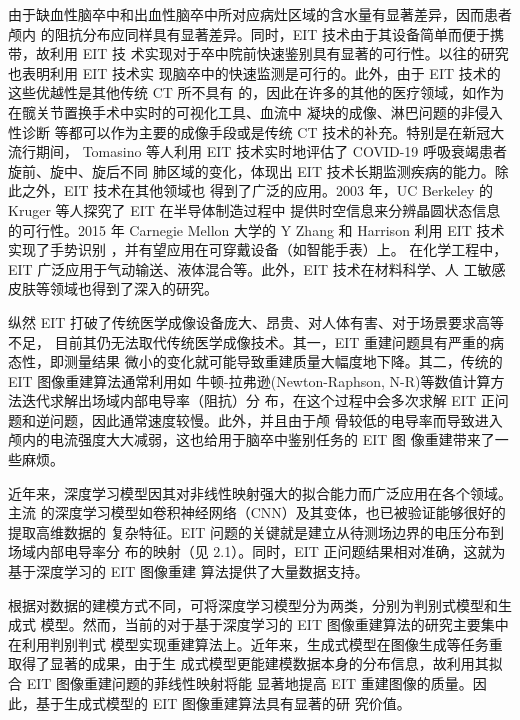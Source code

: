   由于缺血性脑卒中和出血性脑卒中所对应病灶区域的含水量有显著差异，因而患者颅内
  的阻抗分布应同样具有显著差异。同时，EIT 技术由于其设备简单而便于携带，故利用 EIT 技
  术实现对于卒中院前快速鉴别具有显著的可行性。以往的研究\cite{8936983}\cite{2023Applied}\cite{Acosd}也表明利用 EIT 技术实
  现脑卒中的快速监测是可行的。此外，由于 EIT 技术的这些优越性是其他传统 CT 所不具有
  的，因此在许多的其他的医疗领域，如作为在髋关节置换手术中实时的可视化工具、血流中
  凝块的成像、淋巴问题的非侵入性诊断\cite{2018MAET}
  等都可以作为主要的成像手段或是传统 CT 技术的补充。特别是在新冠大流行期间，
  Tomasino 等人利用 EIT 技术实时地评估了 COVID-19 呼吸衰竭患者旋前、旋中、旋后不同
  肺区域的变化\cite{articleTSS}，体现出 EIT 技术长期监测疾病的能力。除此之外，EIT 技术在其他领域也
  得到了广泛的应用。2003 年，UC Berkeley 的 Kruger 等人探究了 EIT 在半导体制造过程中
  提供时空信息来分辨晶圆状态信息的可行性\cite{2003Tomography}。2015 年 Carnegie Mellon 大学的 Y Zhang 和
  Harrison 利用 EIT 技术实现了手势识别 \cite{CMU2015}，并有望应用在可穿戴设备（如智能手表）上。
  在化学工程中，EIT 广泛应用于气动输送、液体混合等。\cite{2003Chemical}此外，EIT 技术在材料科学\cite{2007CBEIT}、人
  工敏感皮肤\cite{2020Artificial}等领域也得到了深入的研究。
  
  纵然 EIT 打破了传统医学成像设备庞大、昂贵、对人体有害、对于场景要求高等不足，
目前其仍无法取代传统医学成像技术。其一，EIT 重建问题具有严重的病态性，即测量结果
微小的变化就可能导致重建质量大幅度地下降。其二，传统的 EIT 图像重建算法通常利用如
牛顿-拉弗逊(Newton-Raphson, N-R)等数值计算方法迭代求解出场域内部电导率（阻抗）分
布，在这个过程中会多次求解 EIT 正问题和逆问题，因此通常速度较慢。此外，并且由于颅
骨较低的电导率而导致进入颅内的电流强度大大减弱，这也给用于脑卒中鉴别任务的 EIT 图
像重建带来了一些麻烦。


近年来，深度学习模型因其对非线性映射强大的拟合能力而广泛应用在各个领域。主流
的深度学习模型如卷积神经网络（CNN）及其变体，也已被验证能够很好的提取高维数据的
复杂特征\cite{Yann2015Deep}。EIT 问题的关键就是建立从待测场边界的电压分布到场域内部电导率分
布的映射（见 2.1）。同时，EIT 正问题结果相对准确，这就为基于深度学习的 EIT 图像重建
算法提供了大量数据支持。


根据对数据的建模方式不同，可将深度学习模型分为两类，分别为判别式模型和生成式
模型。然而，当前的对于基于深度学习的 EIT 图像重建算法的研究主要集中在利用判别判式
模型实现重建算法上。近年来，生成式模型在图像生成等任务重取得了显著的成果，由于生
成式模型更能建模数据本身的分布信息，故利用其拟合 EIT 图像重建问题的菲线性映射将能
显著地提高 EIT 重建图像的质量。因此，基于生成式模型的 EIT 图像重建算法具有显著的研
究价值。

